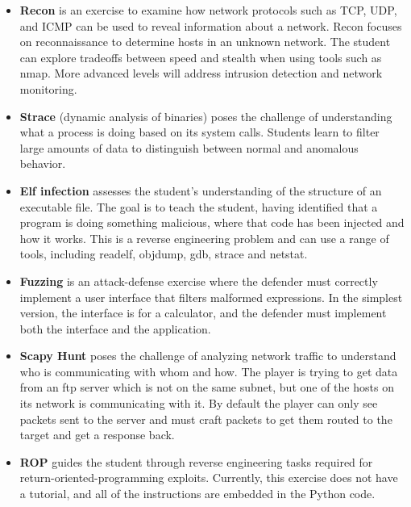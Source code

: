 \documentclass[11pt]{report}
\newcommand{\eat}[1]{}
\begin{document}
\begin{itemize}
\item {\bf Recon} is an exercise to examine how network protocols such as TCP, UDP, and ICMP 
can be used to reveal information about a network.  Recon 
focuses on reconnaissance to determine hosts in an unknown network. 
The student can explore tradeoffs between speed and stealth
when using tools such as nmap.
More advanced levels will address intrusion detection and network monitoring.

\item {\bf Strace} (dynamic analysis of binaries) poses the challenge of 
 understanding what
a process is doing based on its system calls.  Students learn to filter large 
amounts of data to distinguish between normal and anomalous behavior.

\item {\bf Elf infection} assesses the student's understanding 
of the structure of an executable file.  The goal is to teach the student, having identified that a program is 
doing something malicious, where that code has been injected and how it works.  This 
is a reverse engineering problem and can use a range of tools, including readelf, objdump, gdb, 
strace and netstat.

\item {\bf Fuzzing} is an attack-defense exercise where the defender must correctly implement a user 
interface that filters malformed expressions.  In the simplest version, the interface is for a 
calculator, and the defender must implement both the interface and the application.  

\item {\bf Scapy Hunt} poses the challenge of analyzing network traffic 
to understand who is communicating with whom and how. The player is trying to get data from an ftp server
which is not on the same subnet, but one of the hosts on its network is communicating with it.
By default the player can only see packets sent to the server and must craft packets to get them routed
to the target and get a response back.

\item {\bf ROP} guides the student through reverse engineering tasks required for return-oriented-programming exploits.  Currently, this exercise does not have a tutorial, and all of the instructions are embedded in the Python code.

\eat{
\item {\bf Firewall} is still being implemented.  It requires students to understand the 
interactions between multiple firewalls which have different rule sets.
} %
\end{itemize}
\end{document}
